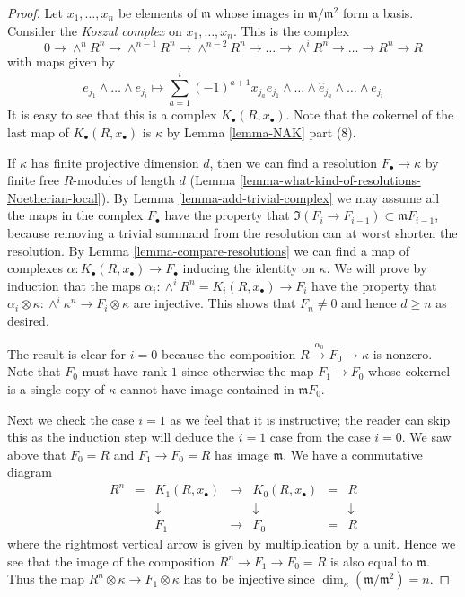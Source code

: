 \begin{proof}
Let $x_1 , \ldots, x_n$ be elements of $\mathfrak m$
whose images in $\mathfrak m / \mathfrak m^2$ form a basis.
Consider the {\it Koszul complex} on $x_1, \ldots, x_n$.
This is the complex
$$
0 \to \wedge^n R^n \to \wedge^{n-1} R^n \to \wedge^{n-2} R^n \to
\ldots \to \wedge^i R^n \to \ldots \to R^n \to R
$$
with maps given by
$$
e_{j_1} \wedge \ldots \wedge e_{j_i}
\longmapsto
\sum_{a = 1}^i (-1)^{a + 1} x_{j_a} e_{j_1} \wedge \ldots
\wedge \hat e_{j_a} \wedge \ldots \wedge e_{j_i}
$$
It is easy to see that this is a complex $K_{\bullet}(R, x_{\bullet})$.
Note that the cokernel of the last map of $K_{\bullet}(R, x_{\bullet})$
is $\kappa$ by Lemma \ref{lemma-NAK} part (8).

\medskip\noindent
If $\kappa$ has finite projective dimension $d$, then we can find
a resolution $F_{\bullet} \to \kappa$ by finite free $R$-modules
of length $d$
(Lemma \ref{lemma-what-kind-of-resolutions-Noetherian-local}).
By Lemma \ref{lemma-add-trivial-complex}
we may assume all the maps in the complex $F_{\bullet}$
have the property that $\Im(F_i \to F_{i-1})
\subset \mathfrak m F_{i-1}$, because removing a trivial
summand from the resolution can at worst shorten the resolution.
By Lemma \ref{lemma-compare-resolutions} we can find a map
of complexes $\alpha : K_{\bullet}(R, x_{\bullet}) \to F_{\bullet}$
inducing the identity on $\kappa$. We will prove by induction
that the maps $\alpha_i : \wedge^i R^n = K_i(R, x_{\bullet}) \to F_i$
have the property that
$\alpha_i \otimes \kappa : \wedge^i \kappa^n \to F_i \otimes \kappa$
are injective. This shows that $F_n \not = 0$ and hence $d \geq n$
as desired.

\medskip\noindent
The result is clear for $i = 0$ because the composition
$R \xrightarrow{\alpha_0} F_0 \to \kappa$ is nonzero.
Note that $F_0$ must have rank $1$ since
otherwise the map $F_1 \to F_0$ whose cokernel is a single
copy of $\kappa$ cannot have image contained in $\mathfrak m F_0$.

\medskip\noindent
Next we check the case $i = 1$ as we feel that it is instructive;
the reader can skip this as the induction step will deduce the $i = 1$
case from the case $i = 0$. We saw above that
$F_0 = R$ and $F_1 \to F_0 = R$ has image $\mathfrak m$.
We have a commutative diagram
$$
\begin{matrix}
R^n & = & K_1(R, x_{\bullet}) & \to & K_0(R, x_{\bullet}) & = & R \\
& & \downarrow & & \downarrow & & \downarrow \\
& & F_1 & \to & F_0 & = & R
\end{matrix}
$$
where the rightmost vertical arrow is given by multiplication
by a unit. Hence we see that the image of the composition
$R^n \to F_1 \to F_0 = R$ is also equal to $\mathfrak m$.
Thus the map $R^n \otimes \kappa \to F_1 \otimes \kappa$
has to be injective since $\dim_\kappa (\mathfrak m / \mathfrak m^2) = n$.


\end{proof}

